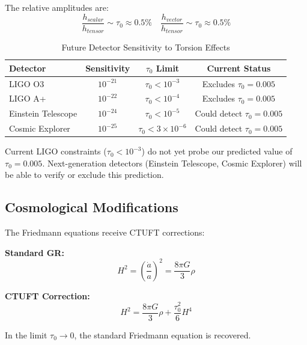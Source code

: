 The relative amplitudes are:
\begin{equation}
    \frac{h_{scalar}}{h_{tensor}} \sim \tau_0 \approx 0.5\%
    \quad
    \frac{h_{vector}}{h_{tensor}} \sim \tau_0 \approx 0.5\%
\end{equation}

\begin{table}[htbp]
\centering
\caption{Future Detector Sensitivity to Torsion Effects}
\begin{tabular}{@{}lccc@{}}
\hline
Detector & Sensitivity & $\tau_0$ Limit & Current Status \\
\hline
LIGO O3 & $10^{-21}$ & $\tau_0 < 10^{-3}$ & Excludes $\tau_0 = 0.005$ \\
LIGO A+ & $10^{-22}$ & $\tau_0 < 10^{-4}$ & Excludes $\tau_0 = 0.005$ \\
Einstein Telescope & $10^{-24}$ & $\tau_0 < 10^{-5}$ & Could detect $\tau_0 = 0.005$ \\
Cosmic Explorer & $10^{-25}$ & $\tau_0 < 3\times 10^{-6}$ & Could detect $\tau_0 = 0.005$ \\
\hline
\end{tabular}
\label{tab:gw_detectors}
\end{table}

\begin{remark}
Current LIGO constraints ($\tau_0 < 10^{-3}$) do not yet probe our predicted value of $\tau_0 = 0.005$. Next-generation detectors (Einstein Telescope, Cosmic Explorer) will be able to verify or exclude this prediction.
\end{remark}

\subsection{Cosmological Modifications}

The Friedmann equations receive CTUFT corrections:

\textbf{Standard GR:}
\begin{equation}
    H^2 = \left(\frac{\dot{a}}{a}\right)^2 = \frac{8\pi G}{3}\rho
\end{equation}

\textbf{CTUFT Correction:}
\begin{equation}
    H^2 = \frac{8\pi G}{3}\rho + \frac{\tau_0^2}{6}H^4
    \label{eq:modified_friedmann}
\end{equation}

In the limit $\tau_0 \to 0$, the standard Friedmann equation is recovered.

